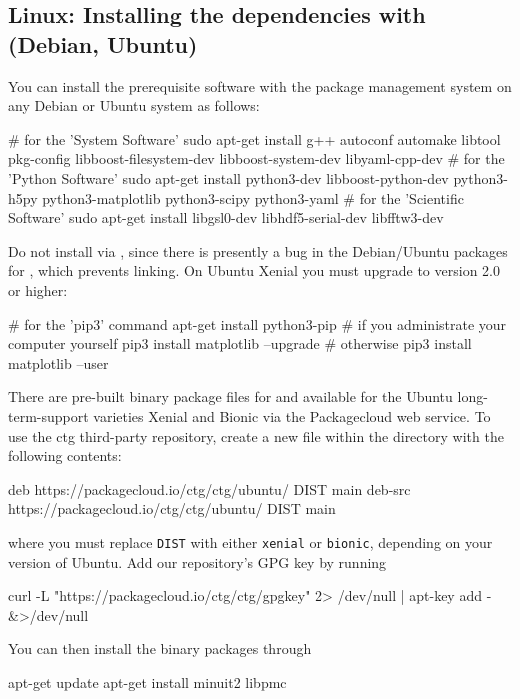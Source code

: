 \subsection{Linux: Installing the dependencies with  (Debian, Ubuntu)}

You can install the prerequisite software with the  package
management system on any Debian or Ubuntu system as follows:
\begin{commandline}
# for the 'System Software'
sudo apt-get install g++ autoconf automake libtool pkg-config libboost-filesystem-dev libboost-system-dev libyaml-cpp-dev
# for the 'Python Software'
sudo apt-get install python3-dev libboost-python-dev python3-h5py python3-matplotlib python3-scipy python3-yaml
# for the 'Scientific Software'
sudo apt-get install libgsl0-dev libhdf5-serial-dev libfftw3-dev
\end{commandline}
Do not install  via , since there is presently a
bug in the Debian/Ubuntu packages for , which prevents
linking. On Ubuntu Xenial you must upgrade  to version 2.0 or higher:
\begin{commandline}
# for the 'pip3' command
apt-get install python3-pip
# if you administrate your computer yourself
pip3 install matplotlib --upgrade
# otherwise
pip3 install matplotlib --user
\end{commandline}


There are pre-built binary package files for
 and  available for the Ubuntu
long-term-support varieties Xenial and Bionic via the Packagecloud web service.
To use the ctg third-party repository, create a new file  within
the directory  with the following contents:
\begin{file}
deb https://packagecloud.io/ctg/ctg/ubuntu/ DIST main
deb-src https://packagecloud.io/ctg/ctg/ubuntu/ DIST main
\end{file}
where you must replace \texttt{DIST} with either \texttt{xenial} or
\texttt{bionic}, depending on your version of Ubuntu. Add our repository's
GPG key by running
\begin{commandline}
curl -L "https://packagecloud.io/ctg/ctg/gpgkey" 2> /dev/null | apt-key add - &>/dev/null
\end{commandline}
You can then install the binary packages through
\begin{commandline}
apt-get update
apt-get install minuit2 libpmc
\end{commandline}

